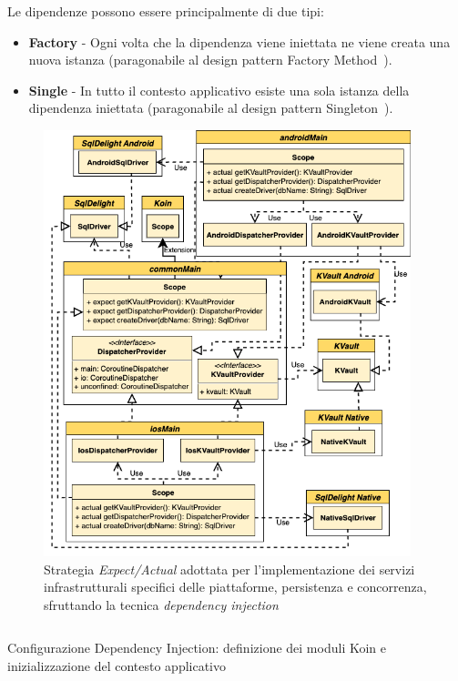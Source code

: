 Le dipendenze possono essere principalmente di due tipi:

\begin{itemize}
    \item \textbf{Factory} - Ogni volta che la dipendenza viene iniettata ne viene creata una nuova istanza (paragonabile al design pattern Factory Method~\cite{gamma1994design}).
    \item \textbf{Single} - In tutto il contesto applicativo esiste una sola istanza della dipendenza iniettata (paragonabile al design pattern Singleton~\cite{gamma1994design}).
\end{itemize}

\begin{figure}[H]
    \centering
    \includegraphics[width=0.95\textwidth]{img/expect-actual-shared.png}
    \caption{Strategia \textit{Expect/Actual} adottata per l'implementazione dei servizi infrastrutturali specifici delle piattaforme, persistenza e concorrenza, sfruttando la tecnica \textit{dependency injection}}
\end{figure}

\begin{listing}[H]
    \inputminted{kotlin}{code/shared-di-koin.kt}
    \caption{Configurazione Dependency Injection: definizione dei moduli Koin e inizializzazione del contesto applicativo}
\end{listing}

